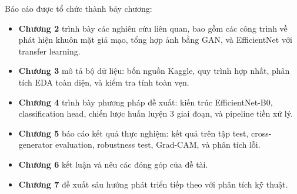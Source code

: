 Báo cáo được tổ chức thành bảy chương:

\begin{itemize}
  \item \textbf{Chương 2} trình bày các nghiên cứu liên quan, bao gồm các công trình về phát hiện khuôn mặt giả mạo, tổng hợp ảnh bằng GAN, và EfficientNet với transfer learning.
  \item \textbf{Chương 3} mô tả bộ dữ liệu: bốn nguồn Kaggle, quy trình hợp nhất, phân tích EDA toàn diện, và kiểm tra tính toàn vẹn.
  \item \textbf{Chương 4} trình bày phương pháp đề xuất: kiến trúc EfficientNet-B0, classification head, chiến lược huấn luyện 3 giai đoạn, và pipeline tiền xử lý.
  \item \textbf{Chương 5} báo cáo kết quả thực nghiệm: kết quả trên tập test, cross-generator evaluation, robustness test, Grad-CAM, và phân tích lỗi.
  \item \textbf{Chương 6} kết luận và nêu các đóng góp của đề tài.
  \item \textbf{Chương 7} đề xuất sáu hướng phát triển tiếp theo với phân tích kỹ thuật.
\end{itemize}
